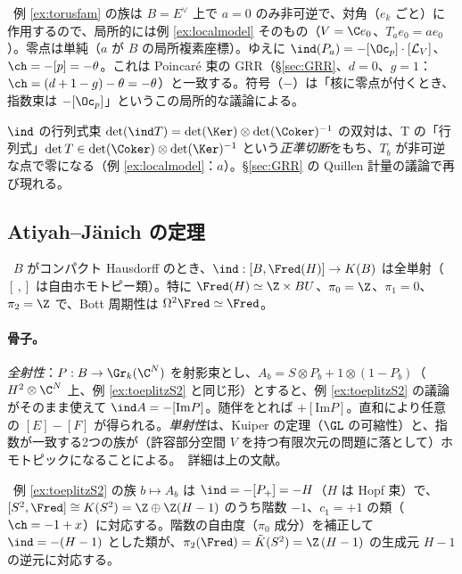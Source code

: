 \begin{ex}\label{ex:torusindex}\tP\
例 \ref{ex:torusfam} の族は $B=E^\vee$ 上で $a=0$ のみ非可逆で、対角（$e_k$ ごと）に作用するので、局所的には例 \ref{ex:localmodel} そのもの（$V=\C e_0$、$T_ae_0=ae_0$）。零点は単純（$a$ が $B$ の局所複素座標）。ゆえに $\ind(P_a)=-[\Oc_p]\cdot[\mathcal L_V]$、$\ch=-[p]=-\theta$。これは Poincaré 束の GRR（\S\ref{sec:GRR}、$d=0$、$g=1$：$\ch=(d+1-g)-\theta=-\theta$）と一致する。符号（$-$）は「核に零点が付くとき、指数束は $-[\Oc_p]$」というこの局所的な議論による。
\end{ex}
\begin{rem}\label{rem:detsection}
$\ind$ の行列式束 $\det(\ind T)=\det(\Ker)\otimes\det(\Coker)^{-1}$ の双対は、T の「行列式」$\det T\in\det(\Coker)\otimes\det(\Ker)^{-1}$ という\emph{正準切断}をもち、$T_b$ が非可逆な点で零になる（例 \ref{ex:localmodel}：$a$）。\S\ref{sec:GRR} の Quillen 計量の議論で再び現れる。
\end{rem}

\subsection{Atiyah--J\"anich の定理}
\begin{thm}\label{thm:AJ}\tC\
$B$ がコンパクト Hausdorff のとき、$\ind:[B,\Fred(H)]\to K(B)$ は全単射（$[\,,]$ は自由ホモトピー類）。特に $\Fred(H)\simeq\Z\times BU$、$\pi_0=\Z$、$\pi_1=0$、$\pi_2=\Z$ で、Bott 周期性は $\Omega^2\Fred\simeq\Fred$。
\end{thm}
\paragraph{骨子。}\emph{全射性}：$P:B\to\Gr_k(\C^N)$ を射影束とし、$A_b=S\otimes P_b+1\otimes(1-P_b)$（$H^2\otimes\C^N$ 上、例 \ref{ex:toeplitzS2} と同じ形）とすると、例 \ref{ex:toeplitzS2} の議論がそのまま使えて $\ind A=-[\mathrm{Im}P]$。随伴をとれば $+[\mathrm{Im}P]$。直和により任意の $[E]-[F]$ が得られる。\emph{単射性}は、Kuiper の定理（$\GL$ の可縮性）と、指数が一致する2つの族が（許容部分空間 $V$ を持つ有限次元の問題に落として）ホモトピックになることによる。\tC\ 詳細は上の文献。
\begin{ex}\label{ex:pi2}\tP\ 例 \ref{ex:toeplitzS2} の族 $b\mapsto A_b$ は $\ind=-[P_+]=-H$（$H$ は Hopf 束）で、$[S^2,\Fred]\cong K(S^2)=\Z\oplus\Z(H-1)$ のうち階数 $-1$、$c_1=+1$ の類（$\ch=-1+x$）に対応する。階数の自由度（$\pi_0$ 成分）を補正して $\ind=-(H-1)$ とした類が、$\pi_2(\Fred)=\tilde K(S^2)=\Z\,(H-1)$ の生成元 $H-1$ の逆元に対応する。\end{ex}

